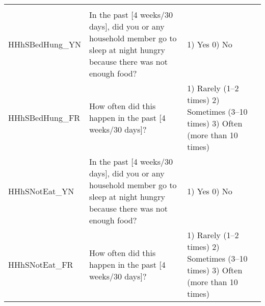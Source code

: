 \documentclass[
]{article}
\begin{document}
\begin{longtable}[]{@{}lll@{}}
\begin{minipage}[t]{0.17\columnwidth}
\end{minipage}\tabularnewline
\begin{minipage}[t]{0.17\columnwidth}\raggedright
HHhSBedHung\_YN\strut
\end{minipage} & \begin{minipage}[t]{0.56\columnwidth}\raggedright
In the past {[}4 weeks/30 days{]}, did you or any household member go to sleep at night hungry because there was not enough food?\strut
\end{minipage} & \begin{minipage}[t]{0.17\columnwidth}\raggedright
1) Yes 0) No\strut
\end{minipage}\tabularnewline
\begin{minipage}[t]{0.17\columnwidth}\raggedright
HHhSBedHung\_FR\strut
\end{minipage} & \begin{minipage}[t]{0.56\columnwidth}\raggedright
How often did this happen in the past {[}4 weeks/30 days{]}?\strut
\end{minipage} & \begin{minipage}[t]{0.17\columnwidth}\raggedright
1) Rarely (1--2 times) 2) Sometimes (3--10 times) 3) Often (more than 10 times)\strut
\end{minipage}\tabularnewline
\begin{minipage}[t]{0.17\columnwidth}\raggedright
HHhSNotEat\_YN\strut
\end{minipage} & \begin{minipage}[t]{0.56\columnwidth}\raggedright
In the past {[}4 weeks/30 days{]}, did you or any household member go to sleep at night hungry because there was not enough food?\strut
\end{minipage} & \begin{minipage}[t]{0.17\columnwidth}\raggedright
1) Yes 0) No\strut
\end{minipage}\tabularnewline
\begin{minipage}[t]{0.17\columnwidth}\raggedright
HHhSNotEat\_FR\strut
\end{minipage} & \begin{minipage}[t]{0.56\columnwidth}\raggedright
How often did this happen in the past {[}4 weeks/30 days{]}?\strut
\end{minipage} & \begin{minipage}[t]{0.17\columnwidth}\raggedright
1) Rarely (1--2 times) 2) Sometimes (3--10 times) 3) Often (more than 10 times)\strut
\end{minipage}\tabularnewline
\bottomrule
\end{longtable}
\end{document}
